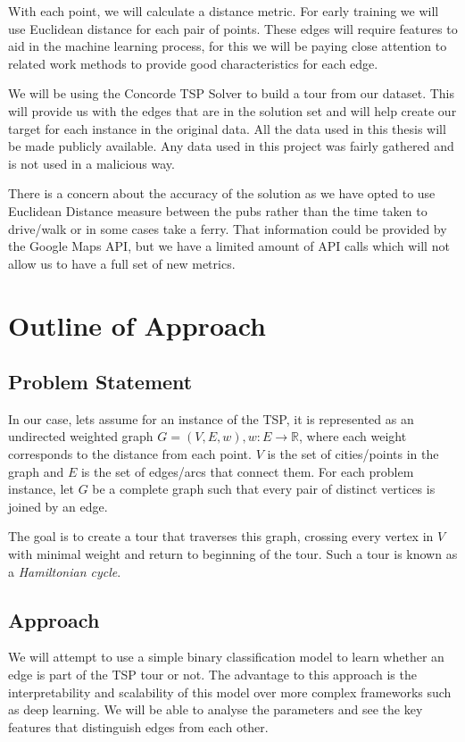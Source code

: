 \documentclass[]{UCD_CS_FYP_Report}
\begin{document}
With each point, we will calculate a distance metric. For early training we will use Euclidean distance for each pair of points. These edges will require features to aid in the machine learning process, for this we will be paying close attention to related work methods to provide good characteristics for each edge.

We will be using the Concorde TSP Solver \cite{davidapplegate2007} to build a tour from our dataset. This will provide us with the edges that are in the solution set and will help create our target for each instance in the original data.
All the data used in this thesis will be made publicly available. Any data used in this project was fairly gathered and is not used in a malicious way.

There is a concern about the accuracy of the solution as we have opted to use Euclidean Distance measure between the pubs rather than the time taken to drive/walk or in some cases take a ferry. That information could be provided by the Google Maps API, but we have a limited amount of API calls which will not allow us to have a full set of new metrics.


\chapter{Outline of Approach}
\section{Problem Statement}
In our case, lets assume for an instance of the TSP, it is represented as an undirected weighted graph $G = (V, E, w), w:E\to\mathbb{R}$, where each weight corresponds to the distance from each point. $V$ is the set of cities/points in the graph and $E$ is the set of edges/arcs that connect them. For each problem instance, let $G$ be a complete graph such that every pair of distinct vertices is joined by an edge.

The goal is to create a tour that traverses this graph, crossing every vertex in $V$ with minimal weight and return to beginning of the tour. Such a tour is known as a \textit{Hamiltonian cycle}.

\section{Approach}
We will attempt to use a simple binary classification model to learn whether an edge is part of the TSP tour or not. The advantage to this approach is the interpretability and scalability of this model over more complex frameworks such as deep learning. We will be able to analyse the parameters and see the key features that distinguish edges from each other.
\end{document}
